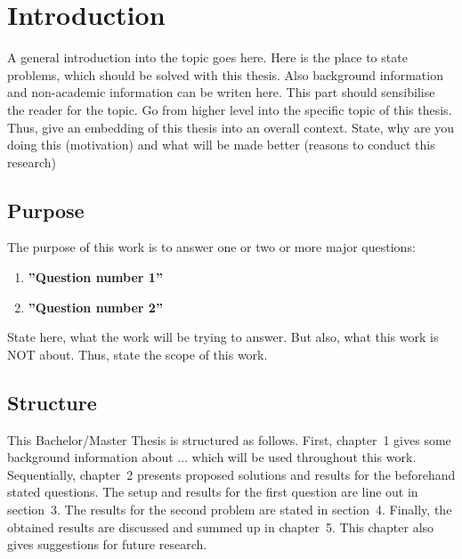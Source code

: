 \chapter{Introduction}
\label{c:introduction}

A general introduction into the topic goes here. Here is the place to state problems, which should be solved with this thesis. Also background information and non-academic information can be writen here. This part should sensibilise the reader for the topic. Go from higher level into the specific topic of this thesis. Thus, give an embedding of this thesis into an overall context. State, why are you doing this (motivation) and what will be made better (reasons to conduct this research)



\section{Purpose}
\label{s:purpose}

The purpose of this work is to answer one or two or more  major questions:
\begin{enumerate}
	\item \textbf{''Question number 1''}
	\item \textbf{''Question number 2''}
\end{enumerate}

State here, what the work will be trying to answer. But also, what this work is NOT about. Thus, state the scope of this work.


\section{Structure}
\label{s:structure}

This Bachelor/Master Thesis is structured as follows. First, chapter~1 gives some background information about ... which will be used throughout this work. Sequentially, chapter~2 presents proposed solutions and results for the beforehand stated questions. The setup and results for the first question are line out in section~3. The results for the second problem are stated in section~4. Finally, the obtained results are discussed and summed up in chapter~5. This chapter also gives suggestions for future research.




















